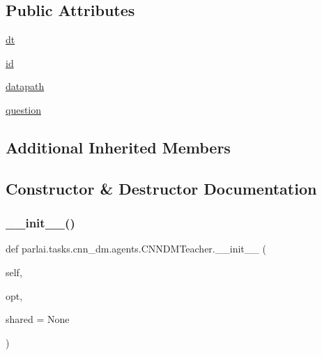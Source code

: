 \subsection*{Public Attributes}
\begin{DoxyCompactItemize}
\item 
\hyperlink{classparlai_1_1tasks_1_1cnn__dm_1_1agents_1_1CNNDMTeacher_a53c9a947f820813c147c427ee932110b}{dt}
\item 
\hyperlink{classparlai_1_1tasks_1_1cnn__dm_1_1agents_1_1CNNDMTeacher_a0057b9cfef0a8a164db0b795980c41e1}{id}
\item 
\hyperlink{classparlai_1_1tasks_1_1cnn__dm_1_1agents_1_1CNNDMTeacher_ac5bd6f991445d012def0d4891084ed06}{datapath}
\item 
\hyperlink{classparlai_1_1tasks_1_1cnn__dm_1_1agents_1_1CNNDMTeacher_adabc9a81947bb5e85f132fc7676958e6}{question}
\end{DoxyCompactItemize}
\subsection*{Additional Inherited Members}


\subsection{Constructor \& Destructor Documentation}
\mbox{\label{classparlai_1_1tasks_1_1cnn__dm_1_1agents_1_1CNNDMTeacher_a2a874e26d57c9f9c399a757f670f9133}} 
\subsubsection{\texorpdfstring{\+\_\+\+\_\+init\+\_\+\+\_\+()}{\_\_init\_\_()}}
{\footnotesize\ttfamily def parlai.\+tasks.\+cnn\+\_\+dm.\+agents.\+C\+N\+N\+D\+M\+Teacher.\+\_\+\+\_\+init\+\_\+\+\_\+ (\begin{DoxyParamCaption}\item[{}]{self,  }\item[{}]{opt,  }\item[{}]{shared = {\ttfamily None} }\end{DoxyParamCaption})}



